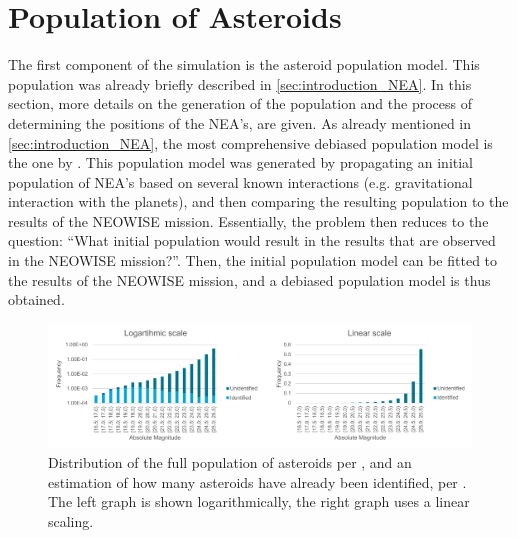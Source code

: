 \section{Population of Asteroids}
\label{sec:modelling_population}
The first component of the simulation is the asteroid population model. This population was already briefly described in \autoref{sec:introduction_NEA}. In this section, more details on the generation of the population and the process of determining the positions of the NEA's, are given. As already mentioned in \autoref{sec:introduction_NEA}, the most comprehensive debiased population model is the one by \cite{GranvikPopulation}. This population model was generated by propagating an initial population of NEA's based on several known interactions (e.g. gravitational interaction with the planets), and then comparing the resulting population to the results of the NEOWISE mission. Essentially, the problem then reduces to the question: ``What initial population would result in the results that are observed in the NEOWISE mission?''. Then, the initial population model can be fitted to the results of the NEOWISE mission, and a debiased population model is thus obtained. \\

\begin{figure}[htbp]
 \centering
 \includegraphics[width=1.0\textwidth]{img/population_identification_correction.pdf}
 \caption{Distribution of the full population of asteroids per \cite{GranvikPopulation}, and an estimation of how many asteroids have already been identified, per \cite{HarrisPopulation}. The left graph is shown logarithmically, the right graph uses a linear scaling.}
 \label{fig:populationcorrection}
\end{figure}


